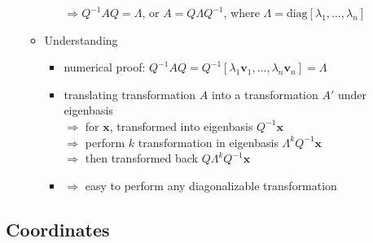 \begin{itemize}
\begin{itemize}
\begin{itemize}
		$\Rightarrow Q^{-1} A Q = \Lambda$, or $A = Q\Lambda Q^{-1}$, where $\Lambda=\text{diag}[\lambda_1,...,\lambda_n]$
		\end{itemize}
	\item Understanding
		\begin{itemize}
		\item numerical proof: $Q^{-1}AQ = Q^{-1}[\lambda_1 \mathbf v_1,...,\lambda_n\mathbf v_n] = \Lambda$
		\item translating transformation $A$ into a transformation $A'$ under eigenbasis \\
		$\Rightarrow$ for $\mathbf x$, transformed into eigenbasis $Q^{-1}\mathbf x$ \\
		$\Rightarrow$ perform $k$ transformation in eigenbasis $\Lambda^kQ^{-1}\mathbf x$ \\
		$\Rightarrow$ then transformed back $Q\Lambda^kQ^{-1} \mathbf x$
		\item $\Rightarrow$ easy to perform any diagonalizable transformation
		\end{itemize}
	\end{itemize}
\end{itemize}

\subsection{Coordinates}
